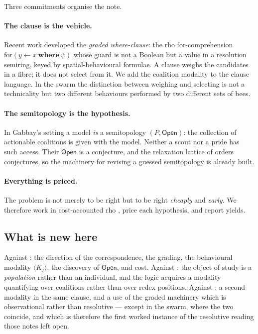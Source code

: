 \documentclass[11pt,a4paper]{article}
\theoremstyle{plain}
\theoremstyle{definition}
\theoremstyle{remark}
\newcommand{\Open}{\mathsf{Open}}
\newcommand{\gK}[1]{\langle K_{#1}\rangle}
\begin{document}
Three commitments organise the note.

\paragraph{The clause is the vehicle.} Recent work \cite{gradedwhere,choicef}
developed the \emph{graded where-clause}: the rho for-comprehension
$\mathrm{for}(y \leftarrow x \ \mathbf{where}\ \psi)$ whose guard is not a
Boolean but a value in a resolution semiring, keyed by spatial-behavioural
formulae. A clause weighs the candidates in a fibre; it does not select from
it. We add the coalition modality to the clause language. In the swarm the
distinction between weighing and selecting is not a technicality but two
different behaviours performed by two different sets of bees.

\paragraph{The semitopology is the hypothesis.} In Gabbay's setting a model
\emph{is} a semitopology $(P,\Open)$: the collection of actionable coalitions
is given with the model. Neither a scout nor a pride has such access. Their
$\Open$ is a conjecture, and the relaxation lattice of \cite{scientist} orders
conjectures, so the machinery for revising a guessed semitopology is already
built.

\paragraph{Everything is priced.} The problem is not merely to be right but to
be right \emph{cheaply} and \emph{early}. We therefore work in cost-accounted
rho \cite{costmonad}, price each hypothesis, and report yields.

\subsection{What is new here}

Against \cite{consensus}: the direction of the correspondence, the grading, the
behavioural modality $\gK{j}$, the discovery of $\Open$, and cost. Against
\cite{scientist,game,compose}: the object of study is a \emph{population}
rather than an individual, and the logic acquires a modality quantifying over
coalitions rather than over redex positions. Against \cite{gradedwhere,choicef}:
a second modality in the same clause, and a use of the graded machinery which is
observational rather than resolutive --- except in the swarm, where the two
coincide, and which is therefore the first worked instance of the resolutive
reading those notes left open.
\end{document}
